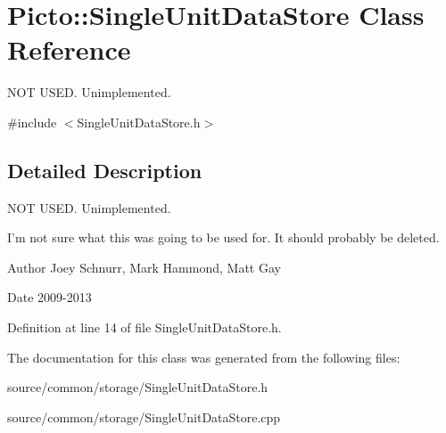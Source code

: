 \hypertarget{class_picto_1_1_single_unit_data_store}{\section{Picto\-:\-:Single\-Unit\-Data\-Store Class Reference}
\label{class_picto_1_1_single_unit_data_store}
}


N\-O\-T U\-S\-E\-D. Unimplemented.  




{\ttfamily \#include $<$Single\-Unit\-Data\-Store.\-h$>$}



\subsection{Detailed Description}
N\-O\-T U\-S\-E\-D. Unimplemented. 

I'm not sure what this was going to be used for. It should probably be deleted. \begin{DoxyAuthor}{Author}
Joey Schnurr, Mark Hammond, Matt Gay 
\end{DoxyAuthor}
\begin{DoxyDate}{Date}
2009-\/2013 
\end{DoxyDate}


Definition at line 14 of file Single\-Unit\-Data\-Store.\-h.



The documentation for this class was generated from the following files\-:\begin{DoxyCompactItemize}
\item 
source/common/storage/Single\-Unit\-Data\-Store.\-h\item 
source/common/storage/Single\-Unit\-Data\-Store.\-cpp\end{DoxyCompactItemize}
